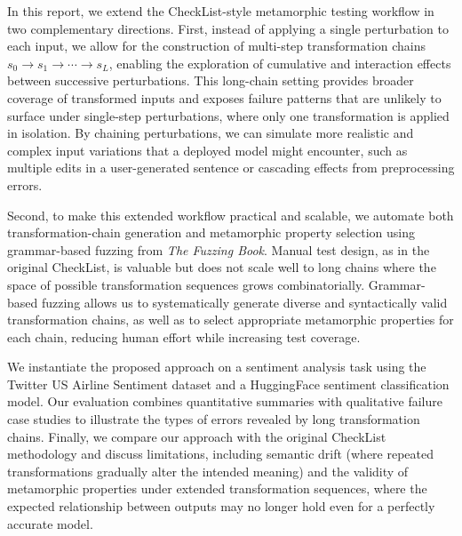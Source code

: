 \documentclass[11pt]{article}
\begin{document}
In this report, we extend the CheckList-style metamorphic testing workflow in two complementary directions. First, instead of applying a single perturbation to each input, we allow for the construction of multi-step transformation chains $s_0 \rightarrow s_1 \rightarrow \cdots \rightarrow s_L$, enabling the exploration of cumulative and interaction effects between successive perturbations. This long-chain setting provides broader coverage of transformed inputs and exposes failure patterns that are unlikely to surface under single-step perturbations, where only one transformation is applied in isolation. By chaining perturbations, we can simulate more realistic and complex input variations that a deployed model might encounter, such as multiple edits in a user-generated sentence or cascading effects from preprocessing errors.

Second, to make this extended workflow practical and scalable, we automate both transformation-chain generation and metamorphic property selection using grammar-based fuzzing from \emph{The Fuzzing Book}. Manual test design, as in the original CheckList, is valuable but does not scale well to long chains where the space of possible transformation sequences grows combinatorially. Grammar-based fuzzing allows us to systematically generate diverse and syntactically valid transformation chains, as well as to select appropriate metamorphic properties for each chain, reducing human effort while increasing test coverage.

We instantiate the proposed approach on a sentiment analysis task using the Twitter US Airline Sentiment dataset and a HuggingFace sentiment classification model. Our evaluation combines quantitative summaries with qualitative failure case studies to illustrate the types of errors revealed by long transformation chains. Finally, we compare our approach with the original CheckList methodology and discuss limitations, including semantic drift (where repeated transformations gradually alter the intended meaning) and the validity of metamorphic properties under extended transformation sequences, where the expected relationship between outputs may no longer hold even for a perfectly accurate model.
\end{document}
